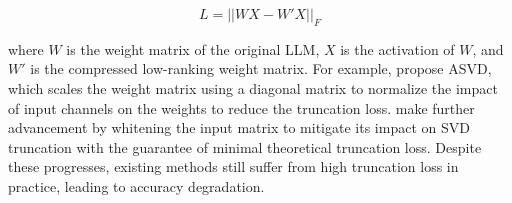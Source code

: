 \begin{equation}
    L = ||WX-W'X||_F 
    \label{eq:t1}
\end{equation}

\noindent where $W$ is the weight matrix of the original LLM, $X$ is the activation of $W$, and $W'$ is the compressed low-ranking weight matrix. 
For example,
%
\citet{DBLP:journals/corr/abs-2312-05821} propose ASVD, which scales the weight matrix using a diagonal matrix to normalize the impact of input channels on the weights to reduce the truncation loss. 
%
\citet{DBLP:journals/corr/abs-2403-07378} make further advancement by whitening the input matrix to mitigate its impact on SVD truncation with the guarantee of minimal theoretical truncation loss. 
%
Despite these progresses, existing methods still suffer from high truncation loss in practice, leading to accuracy degradation.

